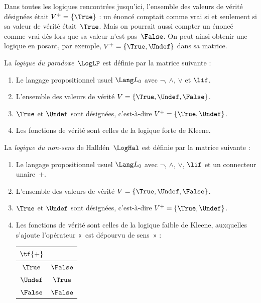\documentclass[../../../include/open-logic-section]{subfiles}
\begin{document}


Dans toutes les logiques rencontrées
jusqu'ici, l'ensemble des valeurs de
vérité désignées était
$V^+=\{\True\}$ : un énoncé comptait
comme vrai si et seulement si sa
valeur de vérité était~$\True$.
Mais on pourrait aussi compter un
énoncé comme vrai dès lors que sa
valeur n'est pas~$\False$. On peut
ainsi obtenir une logique en posant,
par exemple, $V^+=\{\True,\Undef\}$
dans sa matrice.

\begin{defn}
La \emph{logique du paradoxe}~$\LogLP$
est définie par la matrice suivante :
\begin{enumerate}
  \item Le langage propositionnel usuel
  $\Lang L_0$ avec $\lnot$, $\land$,
  $\lor$ et $\lif$.
  \item L'ensemble des valeurs de vérité
  $V=\{\True,\Undef,\False\}$.
  \item $\True$ et $\Undef$ sont
  désignées, c'est-à-dire
  $V^+=\{\True,\Undef\}$.
  \item Les fonctions de vérité sont
  celles de la logique forte de Kleene.
\end{enumerate}
\end{defn}

\begin{defn}
La \emph{logique du non-sens}
de Halld\'en~$\LogHal$ est définie
par la matrice suivante :
\begin{enumerate}
  \item Le langage propositionnel usuel
  $\Lang L_0$ avec $\lnot$, $\land$,
  $\lor$, $\lif$ et un connecteur
  unaire~$+$.
  \item L'ensemble des valeurs de vérité
  $V=\{\True,\Undef,\False\}$.
  \item $\True$ et $\Undef$ sont
  désignées, c'est-à-dire
  $V^+=\{\True,\Undef\}$.
  \item Les fonctions de vérité sont
  celles de la logique faible de
  Kleene, auxquelles s'ajoute
  l'opérateur «~est dépourvu de sens~» :
  \begin{center}
    \begin{tabular}{c|c}
      $\tf{+}$ & \\
      \hline
      $\True$ & $\False$ \\
      $\Undef$ & $\True$ \\
      $\False$ & $\False$
    \end{tabular}
  \end{center}
\end{enumerate}
\end{defn}
\end{document}

